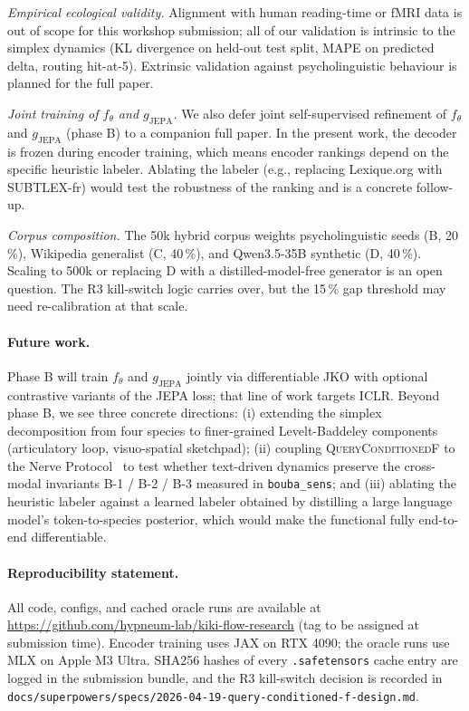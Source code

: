 \textit{Empirical ecological validity.}
Alignment with human reading-time or fMRI data is out of scope for
this workshop submission; all of our validation is intrinsic to the
simplex dynamics (KL divergence on held-out test split, MAPE on
predicted delta, routing hit-at-5). Extrinsic validation against
psycholinguistic behaviour is planned for the full paper.

\textit{Joint training of $f_\theta$ and $g_{\mathrm{JEPA}}$.}
We also defer joint self-supervised refinement of $f_\theta$ and
$g_{\mathrm{JEPA}}$ (phase B) to a companion full paper. In the
present work, the decoder is frozen during encoder training, which
means encoder rankings depend on the specific heuristic labeler.
Ablating the labeler (e.g., replacing Lexique.org with SUBTLEX-fr)
would test the robustness of the ranking and is a concrete follow-up.

\textit{Corpus composition.}
The 50k hybrid corpus weights psycholinguistic seeds (B, 20\,\%),
Wikipedia generalist (C, 40\,\%), and Qwen3.5-35B synthetic (D, 40\,\%).
Scaling to 500k or replacing D with a distilled-model-free generator
is an open question. The R3 kill-switch logic carries over, but
the 15\,\% gap threshold may need re-calibration at that scale.

\paragraph{Future work.}
Phase B will train $f_\theta$ and $g_{\mathrm{JEPA}}$ jointly via
differentiable JKO with optional contrastive variants of the JEPA
loss; that line of work targets ICLR. Beyond phase B, we see three
concrete directions: (i) extending the simplex decomposition from
four species to finer-grained Levelt-Baddeley components
(articulatory loop, visuo-spatial sketchpad); (ii) coupling
\textsc{QueryConditionedF} to the Nerve
Protocol~\citep{saillant2026nervewml} to test whether text-driven
dynamics preserve the cross-modal invariants B-1 / B-2 / B-3
measured in \texttt{bouba\_sens}; and (iii) ablating the heuristic
labeler against a learned labeler obtained by distilling a large
language model's token-to-species posterior, which would make the
functional fully end-to-end differentiable.

\paragraph{Reproducibility statement.}
All code, configs, and cached oracle runs are available at
\url{https://github.com/hypneum-lab/kiki-flow-research} (tag to be
assigned at submission time). Encoder training uses JAX on
RTX 4090; the oracle runs use MLX on Apple M3 Ultra. SHA256 hashes
of every \texttt{.safetensors} cache entry are logged in the
submission bundle, and the R3 kill-switch decision is recorded in
\texttt{docs/superpowers/specs/2026-04-19-query-conditioned-f-design.md}.
